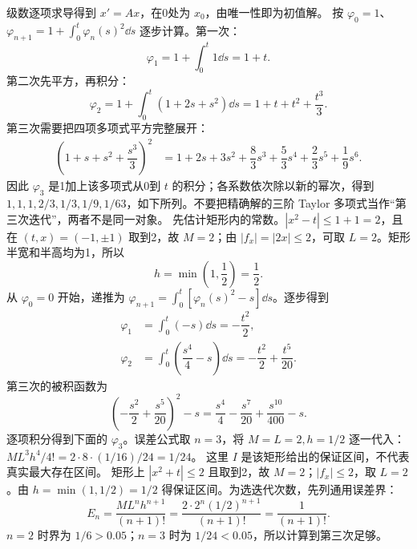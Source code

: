 级数逐项求导得到 $x'=Ax$，在0处为 $x_0$，由唯一性即为初值解。
按 $\varphi_0=1$、$\displaystyle \varphi_{n+1}=1+\int_0^t\varphi_n(s)^2\dd s$ 逐步计算。第一次：
\[
\varphi_1=1+\int_0^t1\dd s=1+t.
\]
第二次先平方，再积分：
\[
\varphi_2=1+\int_0^t(1+2s+s^2)\dd s
=1+t+t^2+\dfrac{t^3}{3}.
\]
第三次需要把四项多项式平方完整展开：
\[
\begin{aligned}
\left(1+s+s^2+\dfrac{s^3}{3}\right)^2
&=1+2s+3s^2+\dfrac83s^3+\dfrac53s^4+\dfrac23s^5+\dfrac19s^6.
\end{aligned}
\]
因此 $\varphi_3$ 是1加上该多项式从0到 $t$ 的积分；各系数依次除以新的幂次，得到 $1,1,1,2/3,1/3,1/9,1/63$，如下所列。不要把精确解的三阶 Taylor 多项式当作“第三次迭代”，两者不是同一对象。
先估计矩形内的常数。$|x^2-t|\le1+1=2$，且在 $(t,x)=(-1,\pm1)$ 取到2，故 $M=2$；由 $|f_x|=|2x|\le2$，可取 $L=2$。矩形半宽和半高均为1，所以
\[
h=\min\left(1,\dfrac12\right)=\dfrac12.
\]
从 $\varphi_0=0$ 开始，递推为 $\displaystyle \varphi_{n+1}=\int_0^t[\varphi_n(s)^2-s]\dd s$。逐步得到
\[
\begin{aligned}
\varphi_1&=\int_0^t(-s)\dd s=-\dfrac{t^2}{2},\\
\varphi_2&=\int_0^t\left(\dfrac{s^4}{4}-s\right)\dd s
=-\dfrac{t^2}{2}+\dfrac{t^5}{20}.
\end{aligned}
\]
第三次的被积函数为
\[
\left(-\dfrac{s^2}{2}+\dfrac{s^5}{20}\right)^2-s
=\dfrac{s^4}{4}-\dfrac{s^7}{20}+\dfrac{s^{10}}{400}-s.
\]
逐项积分得到下面的 $\varphi_3$。误差公式取 $n=3$，将 $M=L=2,h=1/2$ 逐一代入：$ML^3h^4/4!=2\cdot8\cdot(1/16)/24=1/24$。
这里 $I$ 是该矩形给出的保证区间，不代表真实最大存在区间。
矩形上 $|x^2+t|\le2$ 且取到2，故 $M=2$；$|f_x|\le2$，取 $L=2$。由 $h=\min(1,1/2)=1/2$ 得保证区间。为选迭代次数，先列通用误差界：
\[
E_n=\dfrac{ML^nh^{n+1}}{(n+1)!}
=\dfrac{2\cdot2^n(1/2)^{n+1}}{(n+1)!}=\dfrac1{(n+1)!}.
\]
$n=2$ 时界为 $1/6>0.05$；$n=3$ 时为 $1/24<0.05$，所以计算到第三次足够。

